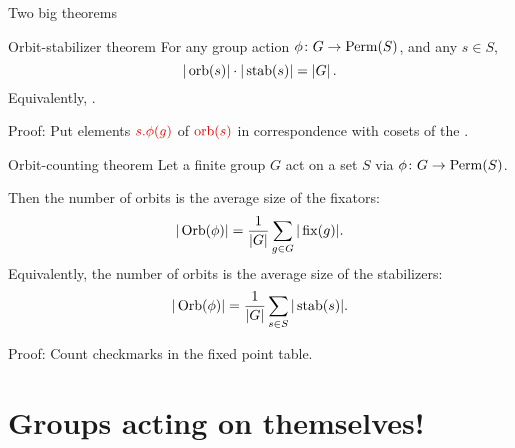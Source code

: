 \documentclass[8pt, handout]{beamer}
\begin{document}

\begin{frame}{Two big theorems}

  \begin{block}{Orbit-stabilizer theorem}
    For any group action $\phi\colon G\to\operatorname{Perm}(S)$, and any $s\in S$,
    \[
    |\operatorname{orb}(s)|\cdot|\operatorname{stab}(s)|=|G|\,.
    \]
    Equivalently, .
  \end{block}

  \smallskip

  Proof: Put elements $\Alert{s.\phi(g)}$ of $\Alert{\orb(s)}$ in correspondence with cosets of the .

  \smallskip

  \begin{block}{Orbit-counting theorem}
    Let a finite group $G$ act on a set $S$ via $\phi\colon G\to\operatorname{Perm}(S)$.
    
    Then the number of orbits is the average size of the fixators:
    \[
    |\operatorname{Orb}(\phi)|=\frac{1}{|G|}\sum_{g\in G}|\operatorname{fix}(g)|.
    \]
    Equivalently, the number of orbits is the average size of the stabilizers:
    \[
    |\operatorname{Orb}(\phi)|=\frac{1}{|G|}\sum_{s\in S}|\operatorname{stab}(s)|.
    \]
  \end{block}

  \smallskip 

  Proof: Count checkmarks in the fixed point table.



\end{frame}


\section{Groups acting on themselves!}


\end{document}
